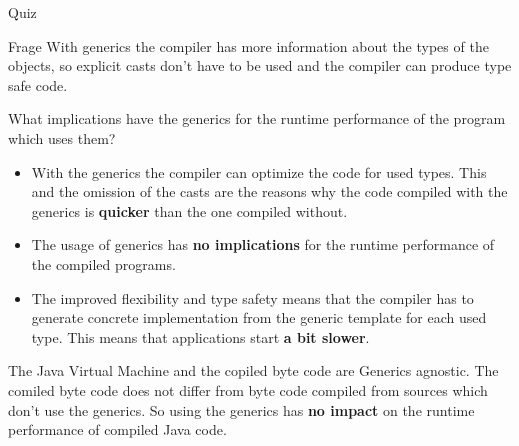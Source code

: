 \documentclass{beamer}
\begin{document}
\begin{frame}{Quiz}
    \begin{block}{Frage}
        With generics the compiler has more information about the 
        types of the objects, so explicit casts don't have to be used 
        and the compiler can produce type safe code.

        What implications have the generics for the runtime 
        performance of the  program which uses them?
    \end{block}

    \begin{overprint}
      \begin{itemize}
      \item With the generics the compiler can optimize the code for 
        used types. This and the omission of the casts are the 
        reasons why the code compiled with the generics is 
        \textbf{quicker} than the one compiled without.
      \item The usage of generics has \textbf{no implications} for 
        the runtime performance of the compiled programs.
      \item The improved flexibility and type safety means that the 
        compiler has to generate concrete implementation from 
        the generic template for each used type. This means 
        that applications start \textbf{a bit slower}.
      \end{itemize}
      The Java Virtual Machine and the copiled byte code are Generics 
      agnostic. The comiled byte code does not differ from byte code 
      compiled from sources which don't use the generics.
      So using the generics has \textbf{no impact} on the runtime 
      performance of compiled Java code.
    \end{overprint}

  \end{frame}
\end{document}
